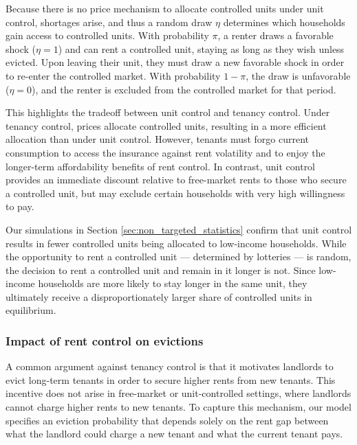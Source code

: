 \documentclass[parskip=full]{article}
\begin{document}
Because there is no price mechanism to allocate controlled units under unit control, shortages arise, and thus a random draw $\eta$ determines which households gain access to controlled units. With probability $\pi$, a renter draws a favorable shock ($\eta=1$) and can rent a controlled unit, staying as long as they wish unless evicted. Upon leaving their unit, they must draw a new favorable shock in order to re-enter the controlled market. With probability $1-\pi$, the draw is unfavorable ($\eta=0$), and the renter is excluded from the controlled market for that period. 

This highlights the tradeoff between unit control and tenancy control. Under tenancy control, prices allocate controlled units, resulting in a more efficient allocation than under unit control. However, tenants must forgo current consumption to access the insurance against rent volatility and to enjoy the longer-term affordability benefits of rent control. In contrast, unit control provides an immediate discount relative to free-market rents to those who secure a controlled unit, but may exclude certain households with very high willingness to pay. 

Our simulations in Section \ref{sec:non_targeted_statistics} confirm that unit control results in fewer controlled units being allocated to low-income households. While the opportunity to rent a controlled unit — determined by lotteries — is random, the decision to rent a controlled unit and remain in it longer is not. Since low-income households are more likely to stay longer in the same unit, they ultimately receive a disproportionately larger share of controlled units in equilibrium.

\subsubsection{Impact of rent control on evictions}

A common argument against tenancy control is that it motivates landlords to evict long-term tenants in order to secure higher rents from new tenants. This incentive does not arise in free-market or unit-controlled settings, where landlords cannot charge higher rents to new tenants. To capture this mechanism, our model specifies an eviction probability that depends solely on the rent gap between what the landlord could charge a new tenant and what the current tenant pays.
\end{document}
